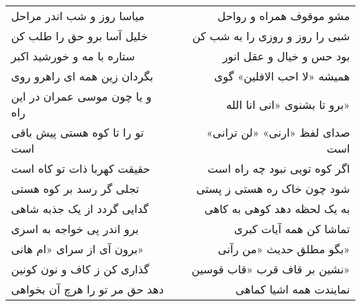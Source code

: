 \begin{center}
\begin{longtable}{l p{0.5cm} r}
میاسا روز و شب اندر مراحل
&&
مشو موقوف همراه و رواحل
\\
خلیل آسا برو حق را طلب کن
&&
شبی را روز و روزی را به شب کن
\\
ستاره با مه و خورشید اکبر
&&
بود حس و خیال و عقل انور
\\
بگردان زین همه ای راهرو روی
&&
همیشه «لا احب الافلین» گوی
\\
و یا چون موسی عمران در این راه
&&
برو تا بشنوی «انی انا الله»
\\
تو را تا کوه هستی پیش باقی است
&&
صدای لفظ «ارنی» «لن ترانی» است
\\
حقیقت کهربا ذات تو کاه است
&&
اگر کوه تویی نبود چه راه است
\\
تجلی گر رسد بر کوه هستی
&&
شود چون خاک ره هستی ز پستی
\\
گدایی گردد از یک جذبه شاهی
&&
به یک لحظه دهد کوهی به کاهی
\\
برو اندر پی خواجه به اسری
&&
تماشا کن همه آیات کبری
\\
برون آی از سرای «ام هانی»
&&
بگو مطلق حدیث «من رآنی»
\\
گذاری کن ز کاف و نون کونین
&&
نشین بر قاف قرب «قاب قوسین»
\\
دهد حق مر تو را هرچ آن بخواهی
&&
نمایندت همه اشیا کماهی
\\
\end{longtable}
\end{center}
